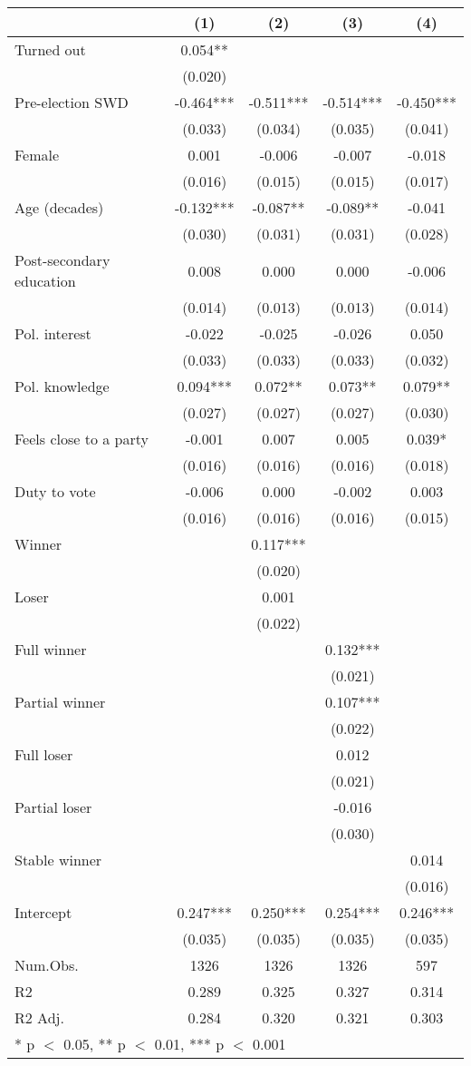 \begin{table}
\centering
\begin{tabular}[t]{lcccc}
\toprule
  & (1) & (2) & (3) & (4)\\
\midrule
Turned out & 0.054** &  &  & \\
 & (0.020) &  &  & \\
Pre-election SWD & -0.464*** & -0.511*** & -0.514*** & -0.450***\\
 & (0.033) & (0.034) & (0.035) & (0.041)\\
Female & 0.001 & -0.006 & -0.007 & -0.018\\
 & (0.016) & (0.015) & (0.015) & (0.017)\\
Age (decades) & -0.132*** & -0.087** & -0.089** & -0.041\\
 & (0.030) & (0.031) & (0.031) & (0.028)\\
Post-secondary education & 0.008 & 0.000 & 0.000 & -0.006\\
 & (0.014) & (0.013) & (0.013) & (0.014)\\
Pol. interest & -0.022 & -0.025 & -0.026 & 0.050\\
 & (0.033) & (0.033) & (0.033) & (0.032)\\
Pol. knowledge & 0.094*** & 0.072** & 0.073** & 0.079**\\
 & (0.027) & (0.027) & (0.027) & (0.030)\\
Feels close to a party & -0.001 & 0.007 & 0.005 & 0.039*\\
 & (0.016) & (0.016) & (0.016) & (0.018)\\
Duty to vote & -0.006 & 0.000 & -0.002 & 0.003\\
 & (0.016) & (0.016) & (0.016) & (0.015)\\
Winner &  & 0.117*** &  & \\
 &  & (0.020) &  & \\
Loser &  & 0.001 &  & \\
 &  & (0.022) &  & \\
Full winner &  &  & 0.132*** & \\
 &  &  & (0.021) \vphantom{1} & \\
Partial winner &  &  & 0.107*** & \\
 &  &  & (0.022) & \\
Full loser &  &  & 0.012 & \\
 &  &  & (0.021) & \\
Partial loser &  &  & -0.016 & \\
 &  &  & (0.030) & \\
Stable winner &  &  &  & 0.014\\
 &  &  &  & (0.016)\\
Intercept & 0.247*** & 0.250*** & 0.254*** & 0.246***\\
 & (0.035) & (0.035) & (0.035) & (0.035)\\
\midrule
Num.Obs. & 1326 & 1326 & 1326 & 597\\
R2 & 0.289 & 0.325 & 0.327 & 0.314\\
R2 Adj. & 0.284 & 0.320 & 0.321 & 0.303\\
\bottomrule
\multicolumn{5}{l}{\rule{0pt}{1em}* p $<$ 0.05, ** p $<$ 0.01, *** p $<$ 0.001}\\
\end{tabular}
\end{table}
